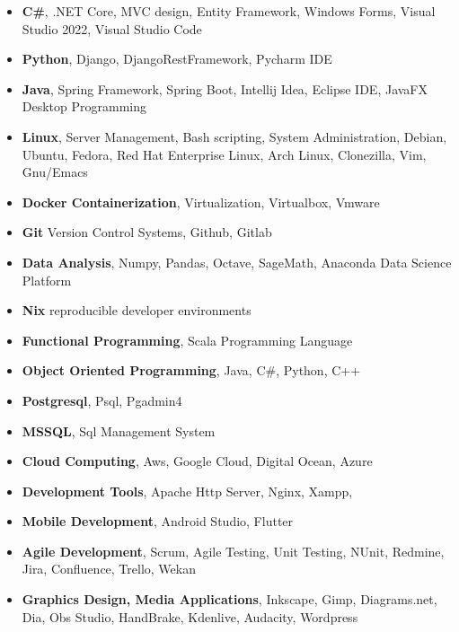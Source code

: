 \documentclass[line,margin]{res}
\begin{document}
\begin{resume}
                 \begin{itemize}  \itemsep -2pt %
                   \item \textbf{C\#}, .NET Core, MVC design, Entity Framework, Windows Forms, Visual Studio 2022, Visual Studio Code
                   \item \textbf{Python}, Django, DjangoRestFramework, Pycharm IDE
                   \item \textbf{Java}, Spring Framework, Spring Boot, Intellij Idea, Eclipse IDE, JavaFX Desktop Programming
                   \item \textbf{Linux}, Server Management, Bash scripting, System Administration, Debian, Ubuntu, Fedora, Red Hat Enterprise Linux, Arch Linux, Clonezilla, Vim, Gnu/Emacs
                   \item \textbf{Docker Containerization}, Virtualization, Virtualbox, Vmware
                   \item \textbf{Git} Version Control Systems, Github, Gitlab
                   \item \textbf{Data Analysis}, Numpy, Pandas, Octave, SageMath, Anaconda Data Science Platform 
                   \item \textbf{Nix} reproducible developer environments
                   \item \textbf{Functional Programming}, Scala Programming Language 
                   \item \textbf{Object Oriented Programming}, Java, C\#, Python, C++ 
                   \item \textbf{Postgresql}, Psql, Pgadmin4 
                   \item \textbf{MSSQL}, Sql Management System 
                   \item \textbf{Cloud Computing}, Aws, Google Cloud, Digital Ocean, Azure
                   \item \textbf{Development Tools}, Apache Http Server, Nginx, Xampp, 
                   \item \textbf{Mobile Development}, Android Studio, Flutter
                   \item \textbf{Agile Development},  Scrum, Agile Testing, Unit Testing, NUnit, Redmine, Jira, Confluence, Trello, Wekan
                   \item \textbf{Graphics Design, Media Applications}, Inkscape, Gimp, Diagrams.net, Dia, Obs Studio, HandBrake, Kdenlive, Audacity, Wordpress
 

\end{itemize}
\end{resume}
\end{document}
